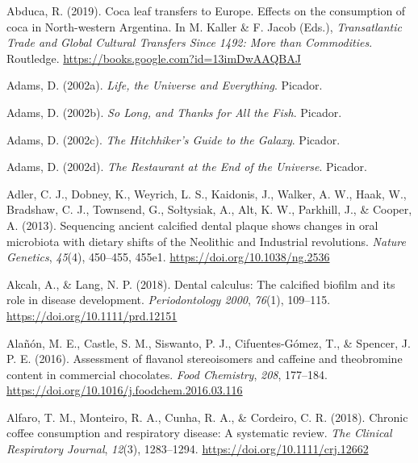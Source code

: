 \documentclass[
  letterpaper,
]{book}
\newlength{\cslhangindent}
\newlength{\cslentryspacingunit} %
\newenvironment{CSLReferences}[2] %
 {%
  \setlength{\parindent}{0pt}
  \ifodd #1
  \let\oldpar\par
  \def\par{\hangindent=\cslhangindent\oldpar}
  \fi
  \setlength{\parskip}{#2\cslentryspacingunit}
 }%
 {}
\begin{document}
\hypertarget{refs}{}
\begin{CSLReferences}{1}{0}
\leavevmode{}%
Abduca, R. (2019). Coca leaf transfers to {Europe}. {Effects} on the
consumption of coca in {North-western Argentina}. In M. Kaller \& F.
Jacob (Eds.), \emph{Transatlantic {Trade} and {Global Cultural Transfers
Since} 1492: {More} than {Commodities}}. {Routledge}.
\url{https://books.google.com?id=13imDwAAQBAJ}

\leavevmode{}%
Adams, D. (2002a). \emph{Life, the {Universe} and {Everything}}.
{Picador}.

\leavevmode{}%
Adams, D. (2002b). \emph{So {Long}, and {Thanks} for {All} the {Fish}}.
{Picador}.

\leavevmode{}%
Adams, D. (2002c). \emph{The {Hitchhiker}'s {Guide} to the {Galaxy}}.
{Picador}.

\leavevmode{}%
Adams, D. (2002d). \emph{The {Restaurant} at the {End} of the
{Universe}}. {Picador}.

\leavevmode{}%
Adler, C. J., Dobney, K., Weyrich, L. S., Kaidonis, J., Walker, A. W.,
Haak, W., Bradshaw, C. J., Townsend, G., Sołtysiak, A., Alt, K. W.,
Parkhill, J., \& Cooper, A. (2013). Sequencing ancient calcified dental
plaque shows changes in oral microbiota with dietary shifts of the
{Neolithic} and {Industrial} revolutions. \emph{Nature Genetics},
\emph{45}(4), 450--455, 455e1. \url{https://doi.org/10.1038/ng.2536}

\leavevmode{}%
Akcalı, A., \& Lang, N. P. (2018). Dental calculus: The calcified
biofilm and its role in disease development. \emph{Periodontology 2000},
\emph{76}(1), 109--115. \url{https://doi.org/10.1111/prd.12151}

\leavevmode{}%
Alañón, M. E., Castle, S. M., Siswanto, P. J., Cifuentes-Gómez, T., \&
Spencer, J. P. E. (2016). Assessment of flavanol stereoisomers and
caffeine and theobromine content in commercial chocolates. \emph{Food
Chemistry}, \emph{208}, 177--184.
\url{https://doi.org/10.1016/j.foodchem.2016.03.116}

\leavevmode{}%
Alfaro, T. M., Monteiro, R. A., Cunha, R. A., \& Cordeiro, C. R. (2018).
Chronic coffee consumption and respiratory disease: {A} systematic
review. \emph{The Clinical Respiratory Journal}, \emph{12}(3),
1283--1294. \url{https://doi.org/10.1111/crj.12662}


\end{CSLReferences}
\end{document}

